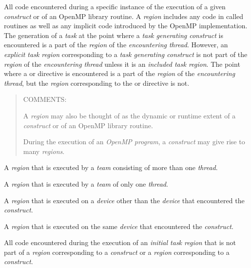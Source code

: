\glossarydefstart
All code encountered during a specific instance of the execution of a given
\emph{construct} or of an OpenMP library routine. A \emph{region} includes 
any code in called routines as well as any implicit code introduced by the 
OpenMP implementation. The generation of a \emph{task} at the point where 
a \emph{task generating construct} is encountered is a part of the 
\emph{region} of the \emph{encountering thread}.  However, an 
\emph{explicit task region} corresponding to a 
\emph{task generating construct} is not part of the \emph{region} of the 
\emph{encountering thread} unless it is an \emph{included task region}. 
The point where a  or  directive is encountered 
is a part of the \emph{region} of the \emph{encountering thread}, but the
\emph{region} corresponding to the  or  directive 
is not.

\begin{quote}
COMMENTS:

A \emph{region} may also be thought of as the dynamic or runtime extent of a
\emph{construct} or of an OpenMP library routine.

During the execution of an \emph{OpenMP program}, a \emph{construct} may give
rise to many \emph{regions}.
\end{quote}
\glossarydefend

\glossarydefstart
A  \emph{region} that is executed by a \emph{team} consisting 
of more than one
\emph{thread}.
\glossarydefend

\smallskip
{}
\glossarydefstart
A  \emph{region} that is executed by a \emph{team} of only 
one \emph{thread}.
\glossarydefend

\glossarydefstart
A  \emph{region} that is executed on a \emph{device} other 
than the \emph{device} that encountered the  \emph{construct}. 
\glossarydefend

\smallskip
{}
\glossarydefstart
A  \emph{region} that is executed on the same \emph{device} 
that encountered the  \emph{construct}.
\glossarydefend

\glossarydefstart
All code encountered during the execution of an \emph{initial task region} 
that is not part of a  \emph{region} corresponding to a 
 \emph{construct} or a 
\emph{region} corresponding to a  \emph{construct}.


